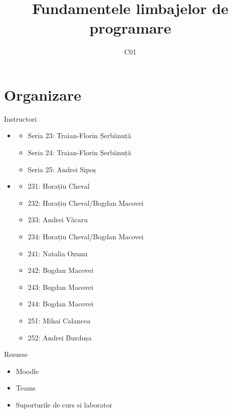 \documentclass[xcolor=pdftex,romanian,colorlinks]{beamer}
\title[FLP]{Fundamentele limbajelor de programare}
\subtitle{C01}
\date{}
\begin{document}
\begin{frame}
  \titlepage
\end{frame}

\section{\color{section-color} Organizare}

\begin{frame}{Instructori}
\begin{itemize}
	\item {}
	\begin{itemize}
		\item Seria 23: Traian-Florin Șerbănuță
		\item Seria 24: Traian-Florin Șerbănuță
		\item Seria 25: Andrei Sipoș
	\end{itemize}
	\vspace{.2cm}
	\item {}
	\begin{itemize}
		\item 231: Horațiu Cheval
		\item 232: Horațiu Cheval/Bogdan Macovei
		\item 233: Andrei V\u acaru
		\item 234: Horațiu Cheval/Bogdan Macovei
		\item 241: Natalia Ozunu
		\item 242: Bogdan Macovei
		\item 243: Bogdan Macovei
		\item 244: Bogdan Macovei
		\item 251: Mihai Calancea
		\item 252: Andrei Burdușa
	\end{itemize}
\end{itemize}
\end{frame}


\begin{frame}{Resurse}
\begin{itemize}
	\item Moodle 
	\vspace{.2cm}
	\item Teams \\ 
	\vspace{.2cm}
	\item Suporturile de curs si laborator \\ 
\end{itemize}
\end{frame}
\end{document}
